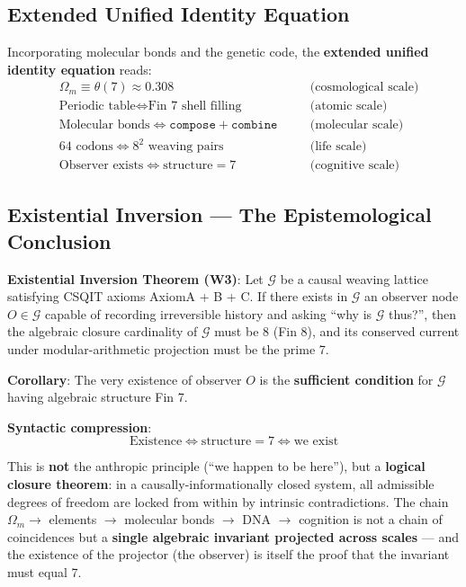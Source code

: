 \documentclass[aps,prd,twocolumn,nofootinbib,floatfix]{revtex4-2}
\begin{document}
\subsection{Extended Unified Identity Equation}

Incorporating molecular bonds and the genetic code, the \textbf{extended unified identity equation} reads:
\[
\boxed{
\begin{aligned}
&\Omega_m \equiv \theta(7) \approx 0.308 \quad &&\text{(cosmological scale)} \\
&\text{Periodic table} \iff \text{Fin 7 shell filling} \quad &&\text{(atomic scale)} \\
&\text{Molecular bonds} \iff \texttt{compose} + \texttt{combine} \quad &&\text{(molecular scale)} \\
&64\text{ codons} \iff 8^2\text{ weaving pairs} \quad &&\text{(life scale)} \\
&\text{Observer exists} \iff \text{structure}=7 \quad &&\text{(cognitive scale)}
\end{aligned}
}
\]

\subsection{Existential Inversion --- The Epistemological Conclusion}

\textbf{Existential Inversion Theorem (W3)}: Let $\mathcal{G}$ be a causal weaving lattice satisfying CSQIT axioms AxiomA + B + C. If there exists in $\mathcal{G}$ an observer node $O \in \mathcal{G}$ capable of recording irreversible history and asking ``why is $\mathcal{G}$ thus?'', then the algebraic closure cardinality of $\mathcal{G}$ must be 8 (Fin 8), and its conserved current under modular-arithmetic projection must be the prime 7.

\textbf{Corollary}: The very existence of observer $O$ is the \textbf{sufficient condition} for $\mathcal{G}$ having algebraic structure Fin 7.

\textbf{Syntactic compression}:
\[
\boxed{\text{Existence} \iff \text{structure}=7 \iff \text{we exist}}
\]

This is \textbf{not} the anthropic principle (``we happen to be here''), but a \textbf{logical closure theorem}: in a causally-informationally closed system, all admissible degrees of freedom are locked from within by intrinsic contradictions. The chain $\Omega_m \to$ elements $\to$ molecular bonds $\to$ DNA $\to$ cognition is not a chain of coincidences but a \textbf{single algebraic invariant projected across scales} --- and the existence of the projector (the observer) is itself the proof that the invariant must equal 7.
\end{document}
